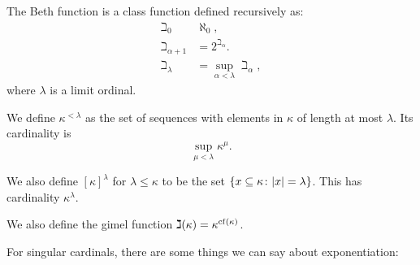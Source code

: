 \begin{definition}
    The Beth function is a class function defined recursively as:
    \begin{align*}
        \beth_{0}        & \aleph_{0},                           \\
        \beth_{\alpha+1} & =2^{\beth_{\alpha}}.                  \\
        \beth_{\lambda}  & =\sup_{\alpha<\lambda}\beth_{\alpha},
    \end{align*}
    where \(\lambda\) is a limit ordinal.
\end{definition}

\begin{definition}
    We define \(\kappa^{<\lambda}\) as the set of sequences with elements in
    \(\kappa\) of length at most \(\lambda\). Its cardinality is
    \[
        \sup_{\mu<\lambda}\kappa^{\mu}.
    \]

    We also define \([\kappa]^{\lambda}\) for \(\lambda\leq\kappa\) to be the
    set \(\left\{x\subseteq\kappa\colon\lvert x\rvert=\lambda\right\}\). This has cardinality
    \(\kappa^{\lambda}\).

    We also define the gimel function \(\gimel(\kappa)=\kappa^{\operatorname{cf}(\kappa)}\).
\end{definition}

For singular cardinals, there are some things we can say about exponentiation:


